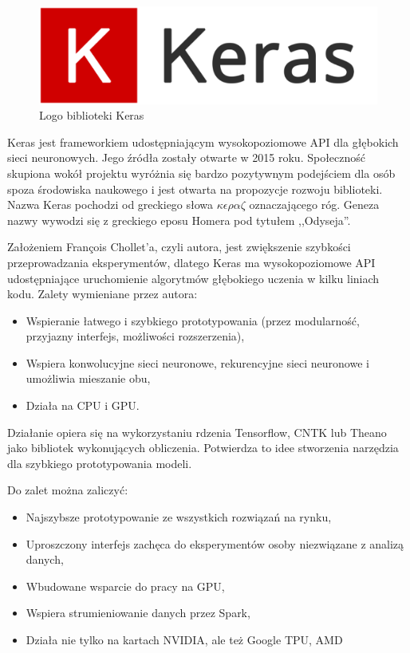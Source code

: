 \documentclass[12pt,a4paper,twoside,titlepage,openright]{book}
\begin{document}
\begin{itemize}
\begin{itemize}
\begin{figure}[ht]
	\centering
			\includegraphics[resolution=100, scale=0.3]{Keras.png}
		\caption{Logo biblioteki Keras}
\end{figure}

Keras jest frameworkiem udostępniającym wysokopoziomowe API dla głębokich sieci neuronowych. Jego źródła zostały otwarte w 2015 roku. Społeczność skupiona wokół projektu wyróżnia się bardzo pozytywnym podejściem dla osób spoza środowiska naukowego i jest otwarta na propozycje rozwoju biblioteki. Nazwa Keras pochodzi od greckiego słowa \(\kappa\epsilon\rho\alpha\zeta\) oznaczającego róg. Geneza nazwy wywodzi się z greckiego eposu Homera pod tytułem ,,Odyseja''.

Założeniem François Chollet'a, czyli autora, jest zwiększenie szybkości przeprowadzania eksperymentów, dlatego Keras ma wysokopoziomowe API udostępniające uruchomienie algorytmów głębokiego uczenia w kilku liniach kodu. Zalety wymieniane przez autora:
\begin{itemize}
\item Wspieranie łatwego i szybkiego prototypowania (przez modularność, przyjazny interfejs, możliwości rozszerzenia),
\item Wspiera konwolucyjne sieci neuronowe, rekurencyjne sieci neuronowe i umożliwia mieszanie obu,
\item Działa na CPU i GPU.
\end{itemize}

Działanie opiera się na wykorzystaniu rdzenia Tensorflow, CNTK lub Theano jako bibliotek wykonujących obliczenia. Potwierdza to idee stworzenia narzędzia dla szybkiego prototypowania modeli. \cite{bookDeepLearningKeras}

Do zalet można zaliczyć:
\begin{itemize}
\item Najszybsze prototypowanie ze wszystkich rozwiązań na rynku,
\item Uproszczony interfejs zachęca do eksperymentów osoby niezwiązane z analizą danych,
\item Wbudowane wsparcie do pracy na GPU,
\item Wspiera strumieniowanie danych przez Spark,
\item Działa nie tylko na kartach NVIDIA, ale też Google TPU, AMD
\end{itemize}


\end{itemize}
\end{itemize}
\end{document}

